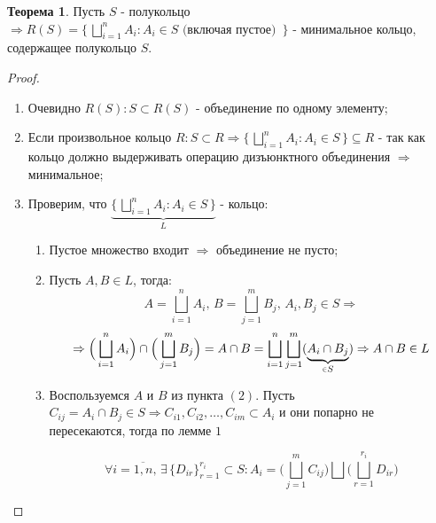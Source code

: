 \documentclass[12pt]{article}
\theoremstyle{definition}
\newtheorem{theorem}{Теорема}
\newcommand{\smallerrel}[1]{\mathrel{\mathpalette\smallerrelaux{#1}}}
\newcommand{\smallerrelaux}[2]{\raisebox{.1ex}{\scalebox{.75}{$#1#2$}}}
\newcommand{\smallin}{\smallerrel{\in}}
\begin{document}
\begin{theorem}
	Пусть $S$ - полукольцо $\Rightarrow R(S) = \Big\{\,\bigsqcup\limits_{i=1}^{n}A_i \colon A_i \in S \text{ (включая пустое) } \,\Big\}$ - минимальное кольцо, содержащее полукольцо $S$.
\end{theorem}
\begin{proof} \hfill
	\begin{enumerate}[label={\arabic*)}]
		\item Очевидно $R(S) \colon S \subset R(S)$ - объединение по одному элементу;
		\item Если произвольное кольцо $R \colon S \subset R \Rightarrow \Big\{\,\bigsqcup\limits_{i=1}^{n}A_i \colon A_i \in S \,\Big\} \subseteq R$ - так как кольцо должно выдерживать операцию дизъюнктного объединения $\Rightarrow$ минимальное;
		\item Проверим, что $\underbrace{\Big\{\,\bigsqcup\limits_{i=1}^{n}A_i \colon A_i \in S \,\Big\}}_{L}$ - кольцо:
		\begin{enumerate}[label={(\arabic*)}]
			\item Пустое множество входит $\Rightarrow$ объединение не пусто;
			
			\item Пусть $A, B \in L$, тогда: 
			$$
				A = \bigsqcup\limits_{i=1}^{n}A_i,\, B =  \bigsqcup\limits_{j=1}^{m}B_j, \, A_i, B_j \in S \Rightarrow
			$$
			$$
				 \Rightarrow \Big(\bigsqcup\limits_{i=1}^{n}A_i\Big) \cap \Big(\bigsqcup\limits_{j=1}^{m}B_j \Big) = A \cap B = \bigsqcup\limits_{i=1}^{n} \bigsqcup\limits_{j=1}^{m} (\underbrace{A_i \cap B_j}_{\smallin S}) \Rightarrow A \cap B \in L
			$$
			
			\item Воспользуемся $A$ и $B$ из пункта $(2)$. Пусть $C_{ij} = A_i \cap B_j \in S \Rightarrow C_{i1}, C_{i2}, \dotsc, C_{im} \subset A_i$ и они попарно не пересекаются, тогда по лемме $1$ 
			
			$$
				\forall i = \overline{1,n}, \, \exists \, \{D_{ir}\}_{r=1}^{r_i} \subset S \colon A_i = \Big(\bigsqcup\limits_{j=1}^{m} C_{ij} \Big) \bigsqcup \Big(\bigsqcup\limits_{r=1}^{r_i} D_{ir}\Big)
			$$ 
				

\end{enumerate}
\end{enumerate}
\end{proof}
\end{document}

